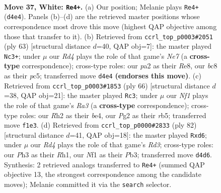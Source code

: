 \documentclass[11pt]{article}
\begin{document}
\clearpage

\begin{figure}[p]\centering
\begin{subfigure}{0.46\textwidth}\centering
\resizebox{\linewidth}{!}{%
\newchessgame
\chessboard[
  setfen={r1b1k3/8/8/1r6/2nR3p/7P/p5PR/K4N2 w q - 0 37},
  showmover=false,
  pgfstyle=straightmove, color=movearrow, markmove={d4-e4}
]}
\caption{}
\end{subfigure}\hfill
\begin{subfigure}{0.46\textwidth}\centering
\resizebox{\linewidth}{!}{%
\newchessgame
\chessboard[
  setfen={2k1r3/2p2R2/p7/1pP3R1/8/4P1B1/r3n2P/1K6 b - - 7 32},
  showmover=false,
  pgfstyle=straightmove, color=movearrow, markmove={e2-c3}
]}
\caption{}
\end{subfigure}
\\[4pt]
\begin{subfigure}{0.46\textwidth}\centering
\resizebox{\linewidth}{!}{%
\newchessgame
\chessboard[
  setfen={2r3k1/2B2p2/P4R2/1r2p1Pp/4b2P/R7/8/4K3 w - - 3 34},
  showmover=false,
  pgfstyle=straightmove, color=movearrow, markmove={a3-c3}
]}
\caption{}
\end{subfigure}\hfill
\begin{subfigure}{0.46\textwidth}\centering
\resizebox{\linewidth}{!}{%
\newchessgame
\chessboard[
  setfen={6k1/6b1/2rrp3/Bp6/5P2/1P1R2p1/P5K1/7R w - - 0 42},
  showmover=false,
  pgfstyle=straightmove, color=movearrow, markmove={d3-d6}
]}
\caption{}
\end{subfigure}
\caption{\textbf{Move 37, White: \texttt{Re4+}.} (a) Our position; Melanie plays \texttt{Re4+} (\texttt{d4e4}). Panels (b)--(d) are the retrieved master positions whose correspondence most drove this move (highest QAP objective among those that transfer to it). (b) Retrieved from \texttt{ccrl\_top\_p0003\#2051} (ply 63) [structural distance $d$=40, QAP obj=7]: the master played \texttt{Nc3+}; under $\mu$ our \emph{Rd4} plays the role of that game's \emph{Ne7} (a \textbf{cross-type} correspondence); cross-type roles: our \emph{p}a2 as their \emph{R}e8, our \emph{b}c8 as their \emph{p}c5; transferred move \texttt{d4e4} \textbf{(endorses this move)}. (c) Retrieved from \texttt{ccrl\_top\_p0003\#1853} (ply 66) [structural distance $d$=38, QAP obj=21]: the master played \texttt{Rc3}; under $\mu$ our \emph{Nf1} plays the role of that game's \emph{Ra3} (a \textbf{cross-type} correspondence); cross-type roles: our \emph{R}h2 as their \emph{b}e4, our \emph{P}g2 as their \emph{r}b5; transferred move \texttt{f1e3}. (d) Retrieved from \texttt{ccrl\_top\_p0000\#2833} (ply 82) [structural distance $d$=41, QAP obj=18]: the master played \texttt{Rxd6}; under $\mu$ our \emph{Rd4} plays the role of that game's \emph{Rd3}; cross-type roles: our \emph{P}h3 as their \emph{R}h1, our \emph{N}f1 as their \emph{P}b3; transferred move \texttt{d4d6}. Synthesis: 2 retrieved analogs transferred to \texttt{Re4+} (summed QAP objective 13, the strongest correspondence among the candidate moves); Melanie committed it via the \texttt{search} selector.}
\label{fig:thought-m72}
\end{figure}
\end{document}
